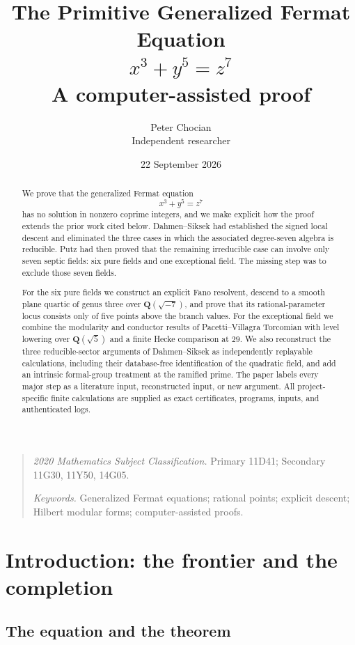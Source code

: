 \documentclass[11pt]{article}
\title{\textbf{The Primitive Generalized Fermat Equation}\\[1mm]
       $x^3+y^5=z^7$\\[3mm]
       \large A computer-assisted proof}
\author{Peter Chocian\\[1mm]\small Independent researcher}
\date{22 September 2026}
\newcommand{\Q}{\mathbf Q}
\theoremstyle{definition}
\theoremstyle{remark}
\begin{document}
\maketitle

\begin{abstract}
We prove that the generalized Fermat equation
\[
                         x^3+y^5=z^7
\]
has no solution in nonzero coprime integers, and we make explicit how the
proof extends the prior work cited below.  Dahmen--Siksek had
established the signed local descent and eliminated the three cases in which
the associated degree-seven algebra is reducible.  Putz had then proved that
the remaining irreducible case can involve only seven septic fields: six
pure fields and one exceptional field.  The missing step was to exclude
those seven fields.

For the six pure fields we construct an explicit Fano resolvent, descend to
a smooth plane quartic of genus three over $\Q(\sqrt{-7})$, and prove that
its rational-parameter locus consists only of five points above the branch
values.  For the
exceptional field we combine the modularity and conductor results of
Pacetti--Villagra Torcomian with level lowering over $\Q(\sqrt5)$ and a
finite Hecke comparison at $29$.  We also reconstruct the three reducible-sector arguments of Dahmen--Siksek as independently replayable calculations, including
their database-free identification of the quadratic field, and add an intrinsic
formal-group treatment at the ramified prime.  The paper labels every major
step as a literature input, reconstructed input, or new argument.  All
project-specific finite calculations are supplied as exact certificates,
programs, inputs, and authenticated logs.
\end{abstract}

\begin{quote}\small
\textit{2020 Mathematics Subject Classification.}
Primary 11D41; Secondary 11G30, 11Y50, 14G05.\par
\textit{Keywords.} Generalized Fermat equations; rational points;
explicit descent; Hilbert modular forms; computer-assisted proofs.
\end{quote}

\tableofcontents

\section{Introduction: the frontier and the completion}

\subsection{The equation and the theorem}
\end{document}
